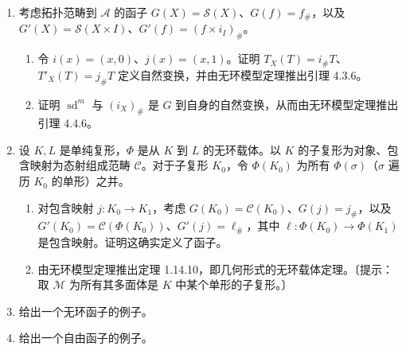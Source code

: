 \begin{enumerate}
\item 考虑拓扑范畴到 $\mathcal A$ 的函子 $G(X)=\mathcal S(X)$、$G(f)=f_\#$，以及 $G'(X)=\mathcal S(X\times I)$、$G'(f)=(f\times i_I)_\#$。
\begin{enumerate}[label=(\alph*)]
\item 令 $i(x)=(x,0)$、$j(x)=(x,1)$。证明 $T_X(T)=i_\#T$、$T'_X(T)=j_\#T$ 定义自然变换，并由无环模型定理推出引理 4.3.6。
\item 证明 $\operatorname{sd}^m$ 与 $(i_X)_\#$ 是 $G$ 到自身的自然变换，从而由无环模型定理推出引理 4.4.6。
\end{enumerate}
\item 设 $K,L$ 是单纯复形，$\Phi$ 是从 $K$ 到 $L$ 的无环载体。以 $K$ 的子复形为对象、包含映射为态射组成范畴 $\mathcal C$。对于子复形 $K_0$，令 $\Phi(K_0)$ 为所有 $\Phi(\sigma)$（$\sigma$ 遍历 $K_0$ 的单形）之并。
\begin{enumerate}[label=(\alph*)]
\item 对包含映射 $j:K_0\to K_1$，考虑 $G(K_0)=\mathcal C(K_0)$、$G(j)=j_\#$，以及 $G'(K_0)=\mathcal C(\Phi(K_0))$、$G'(j)=\ell_\#$，其中 $\ell:\Phi(K_0)\to\Phi(K_1)$ 是包含映射。证明这确实定义了函子。
\item 由无环模型定理推出定理 1.14.10，即几何形式的无环载体定理。〔提示：取 $\mathcal M$ 为所有其多面体是 $K$ 中某个单形的子复形。〕
\end{enumerate}
\item 给出一个无环函子的例子。
\item 给出一个自由函子的例子。
\end{enumerate}
